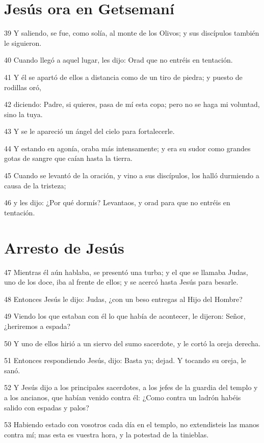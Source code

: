 \section*{Jesús ora en Getsemaní}

\par 39 Y saliendo, se fue, como solía, al monte de los Olivos; y sus discípulos también le siguieron.
\par 40 Cuando llegó a aquel lugar, les dijo: Orad que no entréis en tentación.
\par 41 Y él se apartó de ellos a distancia como de un tiro de piedra; y puesto de rodillas oró,
\par 42 diciendo: Padre, si quieres, pasa de mí esta copa; pero no se haga mi voluntad, sino la tuya.
\par 43 Y se le apareció un ángel del cielo para fortalecerle.
\par 44 Y estando en agonía, oraba más intensamente; y era su sudor como grandes gotas de sangre que caían hasta la tierra.
\par 45 Cuando se levantó de la oración, y vino a sus discípulos, los halló durmiendo a causa de la tristeza;
\par 46 y les dijo: ¿Por qué dormís? Levantaos, y orad para que no entréis en tentación.

\section*{Arresto de Jesús}

\par 47 Mientras él aún hablaba, se presentó una turba; y el que se llamaba Judas, uno de los doce, iba al frente de ellos; y se acercó hasta Jesús para besarle.
\par 48 Entonces Jesús le dijo: Judas, ¿con un beso entregas al Hijo del Hombre?
\par 49 Viendo los que estaban con él lo que había de acontecer, le dijeron: Señor, ¿heriremos a espada?
\par 50 Y uno de ellos hirió a un siervo del sumo sacerdote, y le cortó la oreja derecha.
\par 51 Entonces respondiendo Jesús, dijo: Basta ya; dejad. Y tocando su oreja, le sanó.
\par 52 Y Jesús dijo a los principales sacerdotes, a los jefes de la guardia del templo y a los ancianos, que habían venido contra él: ¿Como contra un ladrón habéis salido con espadas y palos?
\par 53 Habiendo estado con vosotros cada día en el templo, no extendisteis las manos contra mí; mas esta es vuestra hora, y la potestad de la tinieblas.


